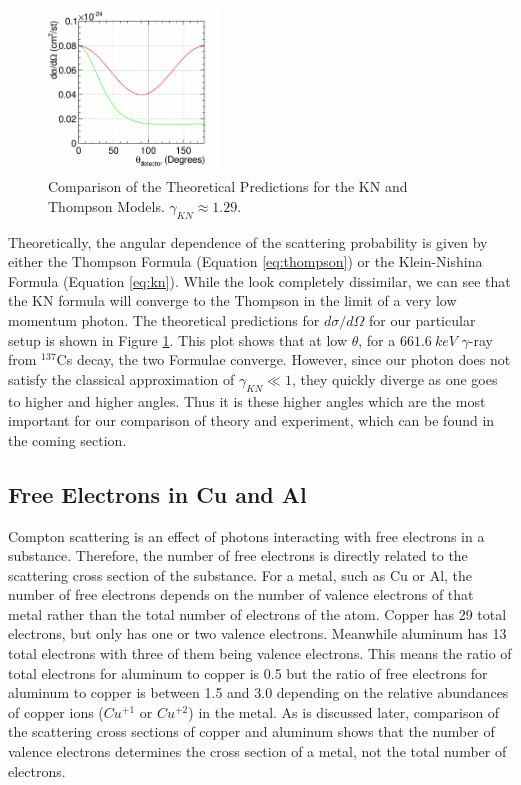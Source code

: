 \documentclass[%
 reprint,
 amsmath,amssymb,
 aps,
 pra,
]{revtex4-1}
\begin{document}
\begin{figure}[H]
	\centering
	\includegraphics[width=0.4\textwidth]{KNvsThompson_TheoryOnly.png}
	\caption{Comparison of the Theoretical Predictions for the KN and Thompson Models. $\gamma_{KN} \approx 1.29$.}
	\label{KN_vs_Thompson_Theory}
\end{figure}

Theoretically, the angular dependence of the scattering probability is given by either the Thompson Formula (Equation \ref{eq:thompson}) or the Klein-Nishina Formula (Equation \ref{eq:kn}). While the look completely dissimilar, we can see that the KN formula will converge to the Thompson in the limit of a very low momentum photon. The theoretical predictions for $d\sigma / d\Omega$ for our particular setup is shown in Figure \ref{KN_vs_Thompson_Theory}. This plot shows that at low $\theta$, for a $661.6~keV$ $\gamma$-ray from $^{137}$Cs decay, the two Formulae converge. However, since our photon does not satisfy the classical approximation of $\gamma_{KN} \ll 1$, they quickly diverge as one goes to higher and higher angles. Thus it is these higher angles which are the most important for our comparison of theory and experiment, which can be found in the coming section.


\subsection{Free Electrons in Cu and Al}
Compton scattering is an effect of photons interacting with free electrons in a substance. Therefore, the number of free electrons is directly related to the scattering cross section of the substance. For a metal, such as Cu or Al, the number of free electrons depends on the number of valence electrons of that metal rather than the total number of electrons of the atom. Copper has 29 total electrons, but only has one or two valence electrons. Meanwhile aluminum has 13 total electrons with three of them being valence electrons. This means the ratio of total electrons for aluminum to copper is 0.5 but the ratio of free electrons for aluminum to copper is between 1.5 and 3.0 depending on the relative abundances of copper ions ($Cu^{+1}$ or $Cu^{+2}$) in the metal. As is discussed later, comparison of the scattering cross sections of copper and aluminum shows that the number of valence electrons determines the cross section of a metal, not the total number of electrons.
\end{document}
